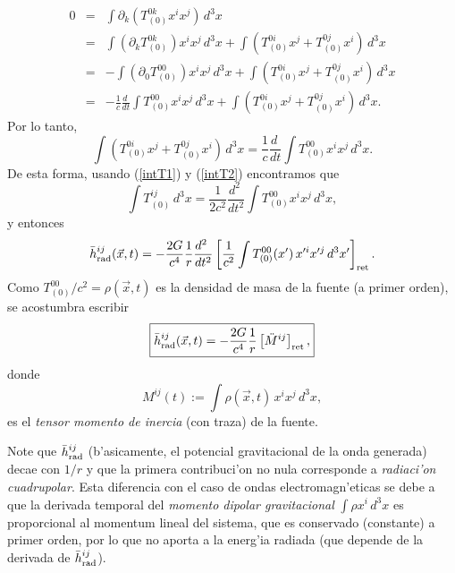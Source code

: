 \begin{eqnarray}
 0&=&\int\partial_k(T^{0k}_{(0)}x^ix^j)\,d^3x\\
&=&\int(\partial_kT^{0k}_{(0)})x^ix^j\,d^3x+\int \left(T^{0i}_{(0)}x^j+T^{0j}_{(0)}x^i\right)\,d^3x\\
&=&-\int(\partial_0T^{00}_{(0)})x^ix^j\,d^3x+\int \left(T^{0i}_{(0)}x^j+T^{0j}_{(0)}x^i\right)\,d^3x\\
&=&-\frac{1}{c}\frac{d\ }{dt}\int T^{00}_{(0)}x^ix^j\,d^3x+\int \left(T^{0i}_{(0)}x^j+T^{0j}_{(0)}x^i\right)\,d^3x.
\end{eqnarray}
Por lo tanto,
\begin{equation}\label{intT2}
 \int \left(T^{0i}_{(0)}x^j+T^{0j}_{(0)}x^i\right)\,d^3x=\frac{1}{c}\frac{d\ }{dt}\int T^{00}_{(0)}x^ix^j\,d^3x.
\end{equation}
De esta forma, usando (\ref{intT1}) y (\ref{intT2}) encontramos que
\begin{equation}
 \int T^{ij}_{(0)}\,d^3x=\frac{1}{2c^2}\frac{d^2\ }{dt^2}\int T^{00}_{(0)}x^ix^j\,d^3x,
\end{equation}
y entonces
\begin{equation}
\bar{h}_{\rm rad}^{ij}(\vec{x},t)=-\frac{2G}{c^4} \frac{1}{r}\frac{d^2\ }{dt^2}\left[\frac{1}{c^2}\int T^{00}_{(0)}(x')\,x'^ix'^j\,d^3x'\right]_{\rm ret}.
\end{equation}
Como $T^{00}_{(0)}/c^2=\rho(\vec{x},t)$ es la densidad de masa de la fuente (a primer orden), se acostumbra escribir
\begin{equation}\label{hrad}
\boxed{\bar{h}_{\rm rad}^{ij}(\vec{x},t)=-\frac{2G}{c^4} \frac{1}{r}\left[\ddot{M}^{ij}\right]_{\rm ret},}
\end{equation}
donde
\begin{equation}
M^{ij}(t):=\int \rho(\vec{x},t)\,x^ix^j\,d^3x,
\end{equation}
es el \textit{tensor momento de inercia} (con traza) de la fuente.

Note que $\bar{h}_{\rm rad}^{ij}$ (b'asicamente, el potencial gravitacional de la onda generada) decae con $1/r$ y que la primera contribuci'on no nula corresponde a \textit{radiaci'on cuadrupolar}. Esta diferencia con el caso de ondas electromagn'eticas se debe a que la derivada temporal del \textit{momento dipolar gravitacional} $\int \rho x^i\,d^3x$ es proporcional al momentum lineal del sistema, que es conservado (constante) a primer orden, por lo que no aporta a la energ'ia radiada (que depende de la derivada de $\bar{h}_{\rm rad}^{ij}$).

